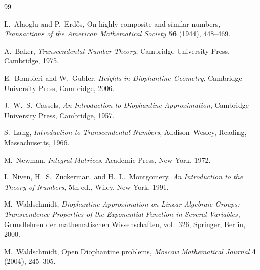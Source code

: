 \documentclass[11pt]{article}
\numberwithin{equation}{section}
\theoremstyle{definition}
\begin{document}
\begin{thebibliography}{99}

L.~Alaoglu and P.~Erd\H{o}s,
\newblock On highly composite and similar numbers,
\newblock \emph{Transactions of the American Mathematical Society} \textbf{56} (1944), 448--469.

A.~Baker,
\newblock \emph{Transcendental Number Theory},
\newblock Cambridge University Press, Cambridge, 1975.

E.~Bombieri and W.~Gubler,
\newblock \emph{Heights in Diophantine Geometry},
\newblock Cambridge University Press, Cambridge, 2006.

J.~W.~S.~Cassels,
\newblock \emph{An Introduction to Diophantine Approximation},
\newblock Cambridge University Press, Cambridge, 1957.

S.~Lang,
\newblock \emph{Introduction to Transcendental Numbers},
\newblock Addison--Wesley, Reading, Massachusetts, 1966.

M.~Newman,
\newblock \emph{Integral Matrices},
\newblock Academic Press, New York, 1972.

I.~Niven, H.~S.~Zuckerman, and H.~L.~Montgomery,
\newblock \emph{An Introduction to the Theory of Numbers}, 5th ed.,
\newblock Wiley, New York, 1991.

M.~Waldschmidt,
\newblock \emph{Diophantine Approximation on Linear Algebraic Groups: Transcendence Properties of the Exponential Function in Several Variables},
\newblock Grundlehren der mathematischen Wissenschaften, vol.~326, Springer, Berlin, 2000.

M.~Waldschmidt,
\newblock Open Diophantine problems,
\newblock \emph{Moscow Mathematical Journal} \textbf{4} (2004), 245--305.

\end{thebibliography}
\end{document}
